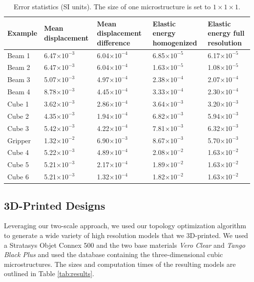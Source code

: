 \begin{table}
	\centering
	\footnotesize
	\caption{Error statistics (SI units). The size of one microstructure is set to $1\times1\times1$.}
	{\begin{tabularx}{\linewidth}{ |X| X | X | X | X | }
			\hline
			Example & Mean displacement & Mean displacement difference & Elastic energy \newline homogenized & Elastic energy \newline full resolution\\ \hline
			Beam 1 & 6.47$\times10^{-3}$ & 6.04$\times10^{-4}$ & 6.85$\times10^{-5}$ & 6.17$\times10^{-5}$ \\
			Beam 2 & 6.47$\times10^{-3}$ & 6.04$\times10^{-4}$ & 1.63$\times10^{-5}$ & 1.08$\times10^{-5}$ \\
			Beam 3 & 5.07$\times10^{-3}$ & 4.97$\times10^{-4}$ & 2.38$\times10^{-4}$ & 2.07$\times10^{-4}$ \\
			Beam 4 & 8.78$\times10^{-3}$ & 4.45$\times10^{-4}$ & 3.33$\times10^{-4}$ & 2.30$\times10^{-4}$ \\
			Cube 1 & 3.62$\times10^{-3}$ & 2.86$\times10^{-4}$ & 3.64$\times10^{-3}$ & 3.20$\times10^{-3}$ \\
			Cube 2 & 4.35$\times10^{-3}$ & 1.94$\times10^{-4}$ & 6.82$\times10^{-3}$ & 5.94$\times10^{-3}$ \\
			Cube 3 & 5.42$\times10^{-3}$ & 4.22$\times10^{-4}$ & 7.81$\times10^{-3}$ & 6.32$\times10^{-3}$ \\
			Gripper& 1.32$\times10^{-2}$ & 6.90$\times10^{-3}$ & 8.67$\times10^{-3}$ & 5.70$\times10^{-3}$ \\
			Cube 4 & 5.22$\times10^{-3}$ & 4.89$\times10^{-4}$ & 2.08$\times10^{-2}$ & 1.63$\times10^{-2}$ \\
			Cube 5 & 5.21$\times10^{-3}$ & 2.17$\times10^{-4}$ & 1.89$\times10^{-2}$ & 1.63$\times10^{-2}$ \\
			Cube 6 & 5.21$\times10^{-3}$ & 1.32$\times10^{-4}$ & 1.82$\times10^{-2}$ & 1.63$\times10^{-2}$ \\
			\hline
		\end{tabularx} }
		\label{tab:hom}
	\end{table}
	
	\subsection{3D-Printed Designs}
	
	Leveraging our two-scale approach, we used our topology optimization algorithm to generate a wide variety of high resolution models that we 3D-printed. We used a Stratasys Objet Connex 500 and the two base materials \emph{Vero Clear} and \emph{Tango Black Plus} and used the database containing the three-dimensional cubic microstructures. The sizes and computation times of the resulting models are outlined in Table \ref{tab:results}. 
	
